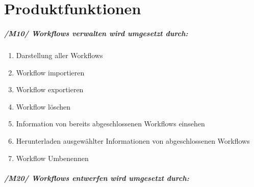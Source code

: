 \chapter{Produktfunktionen}

\paragraph{/M10/ \textit{Workflows verwalten} wird umgesetzt durch:}


\renewcommand{\labelenumi}{/FA\arabic{enumi}0/}
\begin{enumerate}
    \setlength\itemsep{-1em}    
    \item Darstellung aller Workflows
    \item Workflow importieren
    \item Workflow exportieren
    \item Workflow löschen
    \item Information von bereits abgeschlossenen Workflows einsehen
    \item Herunterladen ausgewählter Informationen von abgeschlossenen Workflows
    \item Workflow Umbenennen
    \setcounter{FAs}{\value{enumi}}
\end{enumerate}


\paragraph{/M20/ \textit{Workflows entwerfen} wird umgesetzt durch:}


